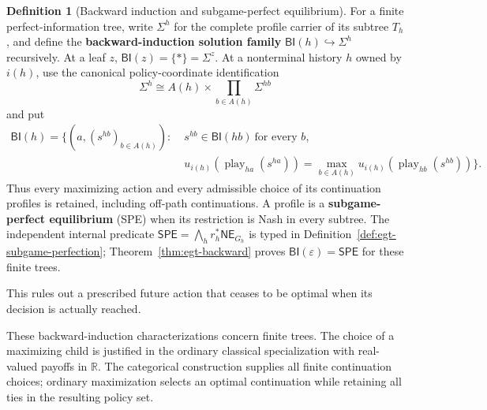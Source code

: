 \documentclass[11pt,a4paper]{article}
\numberwithin{equation}{section}
\theoremstyle{definition}
\newtheorem{definition}[theorem]{Definition}
\theoremstyle{remark}
\theoremstyle{plain}
\begin{document}
\begin{definition}[Backward induction and subgame-perfect equilibrium]
\label{def:egt-backward-induction-spe}
For a finite perfect-information tree, write $\Sigma^h$ for the
complete profile carrier of its subtree $T_h$, and define the
\textbf{backward-induction solution family}
$\mathsf{BI}(h)\hookrightarrow\Sigma^h$ recursively.
At a leaf $z$, $\mathsf{BI}(z)=\{*\}=\Sigma^z$.
At a nonterminal history $h$ owned by $i(h)$, use the canonical
policy-coordinate identification
\[
 \Sigma^h\cong A(h)\times\prod_{b\in A(h)}\Sigma^{hb}
\]
and put
\[
 \begin{split}
 \mathsf{BI}(h)=\{(a,(s^{hb})_{b\in A(h)}):\;&
       s^{hb}\in\mathsf{BI}(hb)\ \text{for every }b,\\
 &u_{i(h)}(\operatorname{play}_{ha}(s^{ha}))
      =\max_{b\in A(h)}
        u_{i(h)}(\operatorname{play}_{hb}(s^{hb}))\}.
 \end{split}
\]
Thus every maximizing action and every admissible choice of its
continuation profiles is retained, including off-path continuations.
A profile is a \textbf{subgame-perfect equilibrium} (SPE) when its
restriction is Nash in every subtree. The independent internal
predicate $\mathsf{SPE}=\bigwedge_h r_h^*\mathsf{NE}_{G_h}$ is typed
in Definition~\ref{def:egt-subgame-perfection};
Theorem~\ref{thm:egt-backward} proves
$\mathsf{BI}(\varepsilon)=\mathsf{SPE}$ for these finite trees.
\end{definition}
This rules out a prescribed future action that ceases to be optimal when
its decision is actually reached.

These backward-induction characterizations concern finite trees.
The choice of a maximizing child is justified in the ordinary
classical specialization with real-valued payoffs in $\mathbb R$.
The categorical construction supplies all finite continuation choices;
ordinary maximization selects an optimal continuation while retaining
all ties in the resulting policy set.
\end{document}
